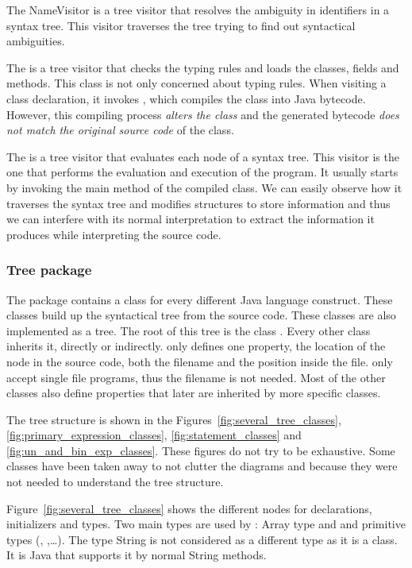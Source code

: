 The NameVisitor is a tree visitor that resolves the ambiguity in identifiers in a syntax tree. This visitor traverses the tree trying to find out syntactical ambiguities.

The  is a tree visitor that checks the typing rules and loads the classes, fields and methods. This  class is not only concerned about typing rules. When visiting a class declaration, it invokes , which compiles the class into Java bytecode. However, this compiling process \textit{alters the class} and the generated bytecode \textit{does not match the original source code} of the class.

The  is a tree visitor that evaluates each node of a syntax tree. This visitor is the one that performs the evaluation and execution of the program. It usually starts by invoking the main method of the compiled class. We can easily observe how it traverses the syntax tree and modifies \djava{} structures to store information and thus we can interfere with its normal interpretation to extract the information it produces while interpreting the source code.

\subsubsection{Tree package}
\label{sec:Tree_package}

The  package contains a class for every different Java language construct. These classes build up the syntactical tree from the source code. These classes are also implemented as a
tree. The root of this tree is the class . Every other class inherits it, directly or indirectly.  only defines one property, the location of the node in the source code, both the filename and the position inside the file. \jel{} only accept single file programs, thus the filename is not needed. Most of the other classes also define properties that later are inherited by more specific classes.

The tree structure is shown in the Figures~\ref{fig:several_tree_classes}, \ref{fig:primary_expression_classes}, \ref{fig:statement_classes} and \ref{fig:un_and_bin_exp_classes}. These figures do not try to be exhaustive. Some classes have been taken away to not clutter the diagrams and because they were not needed to understand the
tree structure.

Figure~\ref{fig:several_tree_classes} shows the different nodes for declarations, initializers and types. Two main types are used by \djava{}: Array type and and primitive types (, ,\ldots). The type String is not considered as a different type as it is a class. It is Java that supports it by normal String methods.

